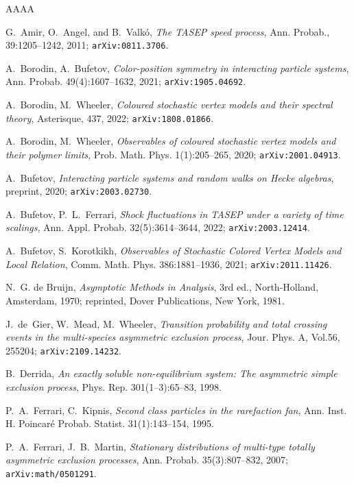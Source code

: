 \documentclass[11pt,reqno]{amsart}
\theoremstyle{definition}
\theoremstyle{remark}
\theoremstyle{remark}
\numberwithin{equation}{section}
\begin{document}
	\begin{thebibliography}{AAAA}
		
		G.~Amir, O.~Angel, and B.~Valk\'{o}, \textit{The TASEP speed process}, Ann. Probab., 39:1205--1242, 2011; {\tt arXiv:0811.3706}.
		
		 A.~Borodin, A.~Bufetov, \textit{Color-position symmetry in interacting particle systems}, Ann. Probab. 49(4):1607--1632, 2021; {\tt arXiv:1905.04692}.
		
		 A.~Borodin, M.~Wheeler, \textit{Coloured stochastic vertex models
			and their spectral theory}, Asterisque, 437, 2022; {\tt arXiv:1808.01866}.
		
		 A.~Borodin, M.~Wheeler, \textit{Observables of coloured stochastic vertex models and their polymer limits}, Prob. Math. Phys. 1(1):205--265, 2020; {\tt arXiv:2001.04913}.
		
		A.~Bufetov, \textit{Interacting particle systems and random walks on Hecke algebras}, preprint, 2020; {\tt arXiv:2003.02730}.
		
		A.~Bufetov, P.~L.~Ferrari, \textit{Shock fluctuations in TASEP under a variety of time scalings},
		Ann. Appl. Probab. 32(5):3614--3644, 2022; {\tt arXiv:2003.12414}.
		
		 A.~Bufetov, S.~Korotkikh, \textit{Observables of Stochastic Colored Vertex Models and Local Relation}, Comm. Math. Phys. 386:1881--1936, 2021; {\tt arXiv:2011.11426}.
		
		N.~G. de Bruijn, \textit{Asymptotic Methods in Analysis}, 3rd ed., North-Holland, Amsterdam, 1970; reprinted, Dover Publications, New York, 1981.
		
		 J.~de~Gier, W.~Mead, M.~Wheeler, \textit{Transition probability and total crossing events in the multi-species asymmetric exclusion process}, Jour. Phys. A, Vol.56, 255204; {\tt arXiv:2109.14232}.
		
		B.~Derrida, \textit{An exactly soluble non-equilibrium system: The asymmetric simple exclusion process}, Phys. Rep. 301(1--3):65--83, 1998.
		
		P.~A.~Ferrari, C.~Kipnis, \textit{Second class particles in the rarefaction fan},
		Ann. Inst. H. Poincar\'e Probab. Statist. 31(1):143--154, 1995.
		
		P.~A.~Ferrari, J.~B.~Martin, \textit{Stationary distributions of multi-type totally asymmetric exclusion processes},
		Ann. Probab. 35(3):807--832, 2007; {\tt arXiv:math/0501291}.
		

\end{thebibliography}
\end{document}
